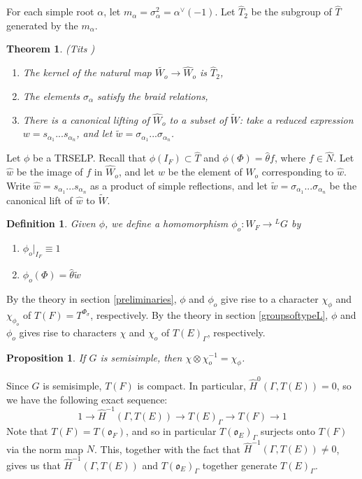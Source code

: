 \documentclass[11pt]{amsart}
\theoremstyle{plain}
\newtheorem{theorem}[enumi]{Theorem}
\newtheorem{proposition}[enumi]{Proposition}
\newtheorem{definition}[enumi]{Definition}
\begin{document}
For each simple root $\alpha$, let $m_{\alpha} = \sigma_{\alpha}^2 = \alpha^{\vee}(-1)$.  Let $\hat{T}_2$ be the subgroup of $\hat{T}$ generated by the $m_{\alpha}$.

\begin{theorem}{(Tits \cite{tits})}
\begin{enumerate}
\item The kernel of the natural map $\widetilde{W_o} \rightarrow \hat{W}_o$ is $\hat{T}_2$,
\item The elements $\sigma_{\alpha}$ satisfy the braid relations,
\item There is a canonical lifting of $\hat{W}_o$ to a subset of $\widetilde{W}$: take a reduced expression $w = s_{\alpha_1} ... s_{\alpha_n}$, and let $\tilde{w} = \sigma_{\alpha_1} ... \sigma_{\alpha_n}$.
\end{enumerate}
\end{theorem}

Let $\phi$ be a TRSELP.  Recall that $\phi(I_F) \subset \hat{T}$ and $\phi(\Phi) = \hat{\theta} f$, where $f \in \hat{N}$.  Let $\hat{w}$ be the image of $f$ in $\hat{W}_o$, and let $w$ be the element of $W_o$ corresponding to $\hat{w}$.  Write $\hat{w} = s_{\alpha_1} ... s_{\alpha_n}$ as a product of simple reflections, and let $\tilde{w} = \sigma_{\alpha_1} ... \sigma_{\alpha_n}$ be the canonical lift of $\hat{w}$ to $\widetilde{W}$.

\begin{definition}
Given $\phi$, we define a homomorphism $\phi_o : W_F \rightarrow {}^L G$ by
\begin{enumerate}
\item $\phi_o|_{I_F} \equiv 1$
\item $\phi_o(\Phi) = \hat{\theta} \tilde{w}$
\end{enumerate}
\end{definition}

By the theory in section \ref{preliminaries}, $\phi$ and $\phi_o$ give rise to a character $\chi_{\phi}$ and $\chi_{\phi_o}$ of $T(F) = T^{\Phi_{\sigma}}$, respectively.  By the theory in section \ref{groupsoftypeL}, $\phi$ and $\phi_o$ gives rise to  characters $\chi$ and $\chi_o$ of $T(E)_{\Gamma}$, respectively.

\begin{proposition}
If $G$ is semisimple, then $\chi \otimes \chi_o^{-1} = \chi_{\phi}$.
\end{proposition}

\proof
Since $G$ is semisimple, $T(F)$ is compact.  In particular, $\hat{H}^0(\Gamma, T(E)) = 0$, so we have the following exact sequence:
$$1 \rightarrow \hat{H}^{-1}(\Gamma, T(E)) \rightarrow T(E)_{\Gamma} \rightarrow T(F) \rightarrow 1$$
Note that $T(F) = T(\mathfrak{o}_F)$, and so in particular $T(\mathfrak{o}_E)_{\Gamma}$ surjects onto $T(F)$ via the norm map $N$.  This, together with the fact that $\hat{H}^{-1}(\Gamma, T(E)) \neq 0$, gives us that $\hat{H}^{-1}(\Gamma,T(E))$ and $T(\mathfrak{o}_E)_{\Gamma}$ together generate $T(E)_{\Gamma}$.
\end{document}
